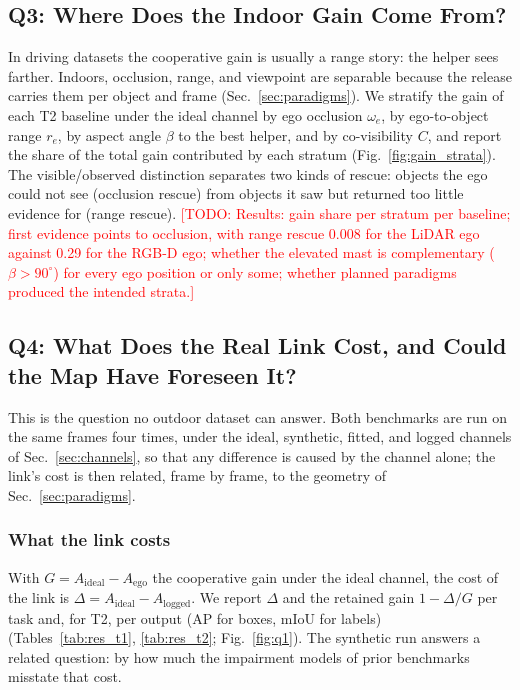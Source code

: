 \documentclass[journal]{IEEEtran}
\newcommand{\todo}[1]{\textcolor{red}{[TODO: #1]}}
\begin{document}


\subsection{Q3: Where Does the Indoor Gain Come From?}
\label{sec:q3_gain}
In driving datasets the cooperative gain is usually a range story: the
helper sees farther. Indoors, occlusion, range, and viewpoint are
separable because the release carries them per object and frame
(Sec.~\ref{sec:paradigms}). We stratify the gain of each T2 baseline
under the ideal channel by ego occlusion $\omega_e$, by ego-to-object
range $r_e$, by aspect angle $\beta$ to the best helper, and by
co-visibility $C$, and report the share of the total gain contributed
by each stratum (Fig.~\ref{fig:gain_strata}). The visible/observed
distinction separates two kinds of rescue: objects the ego could not
see (occlusion rescue) from objects it saw but returned too little
evidence for (range rescue). \todo{Results: gain share per stratum
per baseline; first evidence points to occlusion, with range rescue
0.008 for the LiDAR ego against 0.29 for the RGB-D ego; whether the
elevated mast is complementary ($\beta > 90^\circ$) for every ego
position or only some; whether planned paradigms produced the intended
strata.}



\subsection{Q4: What Does the Real Link Cost, and Could the Map Have Foreseen It?}
\label{sec:results}
This is the question no outdoor dataset can answer. Both benchmarks
are run on the same frames four times, under the ideal, synthetic,
fitted, and logged channels of Sec.~\ref{sec:channels}, so that any
difference is caused by the channel alone; the link's cost is then
related, frame by frame, to the geometry of Sec.~\ref{sec:paradigms}.

\subsubsection{What the link costs}
With $G = A_{\mathrm{ideal}} - A_{\mathrm{ego}}$ the cooperative gain
under the ideal channel, the cost of the link is
$\Delta = A_{\mathrm{ideal}} - A_{\mathrm{logged}}$. We report
$\Delta$ and the retained gain $1 - \Delta/G$ per task and, for T2,
per output (AP for boxes, mIoU for labels)
(Tables~\ref{tab:res_t1}, \ref{tab:res_t2}; Fig.~\ref{fig:q1}). The
synthetic run answers a related question: by how much the impairment
models of prior benchmarks misstate that cost.
\end{document}
